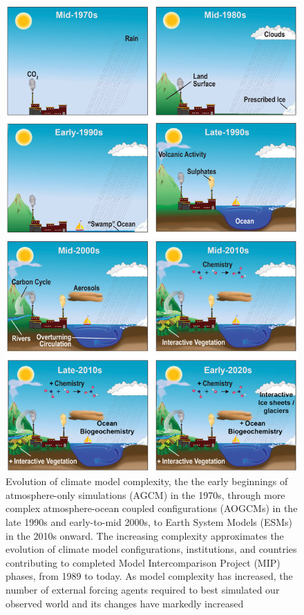 \documentclass[gmd, preprint]{copernicus}
\begin{document}
\begin{figure}
    \centering
    \includegraphics[width=1\linewidth]{AR4WG1_Ch01-p7-Fig1p2_adapted.png}
    \caption{Evolution of climate model complexity, the the early beginnings of atmosphere-only simulations (AGCM) in the 1970s, through more complex atmosphere-ocean coupled configurations (AOGCMs) in the late 1990s and early-to-mid 2000s, to Earth System Models (ESMs) in the 2010s onward. The increasing complexity approximates the evolution of climate model configurations, institutions, and countries contributing to completed Model Intercomparison Project (MIP) phases, from 1989 to today. As model complexity has increased, the number of external forcing agents required to best simulated our observed world and its changes have markedly increased}
    \label{fig:fig1-ModelComplexityThroughTime}
\end{figure}
\end{document}
